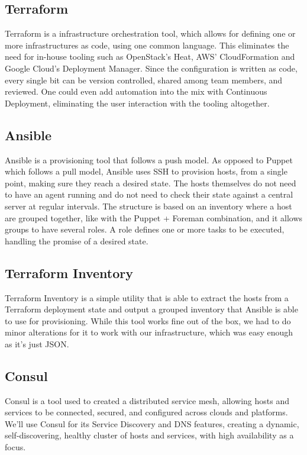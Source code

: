         \subsection{Terraform}
            Terraform is a infrastructure orchestration tool, which allows for defining one or more infrastructures as code, using one common language. This eliminates the need for in-house tooling such as OpenStack's Heat, AWS' CloudFormation and Google Cloud's Deployment Manager. Since the configuration is written as code, every single bit can be version controlled, shared among team members, and reviewed. One could even add automation into the mix with Continuous Deployment, eliminating the user interaction with the tooling altogether.
            
        \subsection{Ansible}
            Ansible is a provisioning tool that follows a push model. As opposed to Puppet which follows a pull model, Ansible uses SSH to provision hosts, from a single point, making sure they reach a desired state. The hosts themselves do not need to have an agent running and do not need to check their state against a central server at regular intervals. The structure is based on an inventory where a host are grouped together, like with the Puppet + Foreman combination, and it allows groups to have several roles. A role defines one or more tasks to be executed, handling the promise of a desired state.

        \subsection{Terraform Inventory}
            Terraform Inventory is a simple utility that is able to extract the hosts from a Terraform deployment state and output a grouped inventory that Ansible is able to use for provisioning. While this tool works fine out of the box, we had to do minor alterations for it to work with our infrastructure, which was easy enough as it's just JSON.

        \subsection{Consul}
            Consul is a tool used to created a distributed service mesh, allowing hosts and services to be connected, secured, and configured across clouds and platforms. We'll use Consul for its Service Discovery and DNS features, creating a dynamic, self-discovering, healthy cluster of hosts and services, with high availability as a focus.

